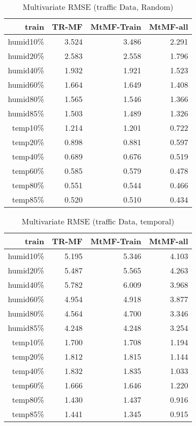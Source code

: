 \begin{table}[htbp]
\setlength{\tabcolsep}{2pt}
\centering
\caption{Multivariate RMSE (traffic Data, Random)}
\label{table_multi_traffic_random}
\begin{tabular}{r | r r r}
train	&TR-MF	&MtMF-Train	&MtMF-all \\ \hline
humid10\%	&3.524 	&3.486 	&2.291\\  
humid20\%	&2.583 	&2.558 	&1.796\\
humid40\%	&1.932 	&1.921 	&1.523\\
humid60\%	&1.664 	&1.649 	&1.408\\
humid80\%	&1.565 	&1.546 	&1.366\\
humid85\%	&1.503 	&1.489 	&1.326\\ \hline
 temp10\%	&1.214 	&1.201 	&0.722\\
 temp20\%	&0.898 	&0.881 	&0.597\\
 temp40\%	&0.689 	&0.676 	&0.519\\
 temp60\%	&0.585 	&0.579 	&0.478\\
 temp80\%	&0.551 	&0.544 	&0.466\\
 temp85\%	&0.520 	&0.510 	&0.434\\
\end{tabular}
\end{table}

\begin{table}[htbp]
\setlength{\tabcolsep}{2pt}
\centering
\caption{Multivariate RMSE (traffic Data, temporal)}
\label{table_multi_traffic_temporal}
\begin{tabular}{r | r r r}
train	&TR-MF	&MtMF-Train	&MtMF-all \\ \hline
humid10\%	&5.195 	&5.346 	&4.103\\  
humid20\%	&5.487 	&5.565 	&4.263\\
humid40\%	&5.782 	&6.009 	&3.968\\
humid60\%	&4.954 	&4.918 	&3.877\\
humid80\%	&4.564 	&4.700 	&3.346\\
humid85\%	&4.248 	&4.248 	&3.254\\ \hline
 temp10\%	&1.700 	&1.708 	&1.194\\
 temp20\%	&1.812 	&1.815 	&1.144\\
 temp40\%	&1.832 	&1.835 	&1.033\\
 temp60\%	&1.666 	&1.646 	&1.220\\
 temp80\%	&1.430 	&1.437 	&0.916\\
 temp85\%	&1.441 	&1.345 	&0.915\\
\end{tabular}
\end{table}

